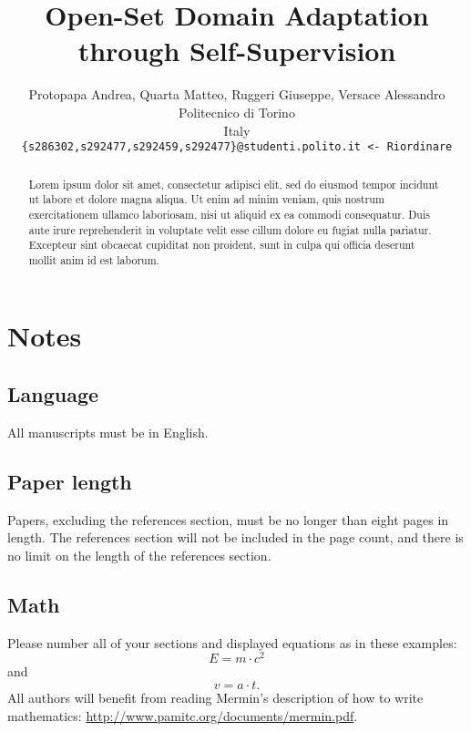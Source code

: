 \documentclass[10pt,twocolumn,letterpaper]{article}
\begin{document}
\title{Open-Set Domain Adaptation through Self-Supervision}

\author{Protopapa Andrea, Quarta Matteo, Ruggeri Giuseppe, Versace Alessandro\\
Politecnico di Torino\\
Italy\\
{\tt\small \{s286302,s292477,s292459,s292477\}@studenti.polito.it <- Riordinare}
}
\maketitle

\begin{abstract}
  Lorem ipsum dolor sit amet, consectetur adipisci elit, sed do eiusmod tempor incidunt ut labore et dolore magna aliqua.
  Ut enim ad minim veniam, quis nostrum exercitationem ullamco laboriosam, nisi ut aliquid ex ea commodi consequatur.
  Duis aute irure reprehenderit in voluptate velit esse cillum dolore eu fugiat nulla pariatur.
  Excepteur sint obcaecat cupiditat non proident, sunt in culpa qui officia deserunt mollit anim id est laborum.
\end{abstract}

\section{Notes}
\label{sec:notes}

\subsection{Language}
All manuscripts must be in English.
\subsection{Paper length}
Papers, excluding the references section, must be no longer than eight pages in length.
The references section will not be included in the page count, and there is no limit on the length of the references section.
\subsection{Math}
Please number all of your sections and displayed equations as in these examples:
\begin{equation}
  E = m\cdot c^2
  \label{eq:important}
\end{equation}
and
\begin{equation}
  v = a\cdot t.
  \label{eq:also-important}
\end{equation}
All authors will benefit from reading Mermin's description of how to write mathematics:
\url{http://www.pamitc.org/documents/mermin.pdf}.
\end{document}
